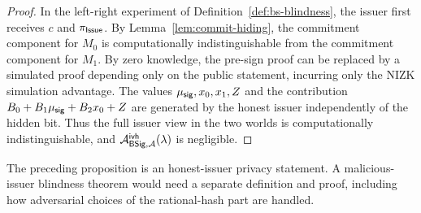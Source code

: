 \begin{proof}
In the left-right experiment of Definition~\ref{def:bs-blindness}, the issuer first receives \(c\) and
\(\pi_{\mathsf{Issue}}\).  By Lemma~\ref{lem:commit-hiding}, the commitment component for \(M_0\) is computationally
indistinguishable from the commitment component for \(M_1\).  By zero knowledge, the pre-sign proof can be
replaced by a simulated proof depending only on the public statement, incurring only the NIZK simulation advantage.
The values \(\mu_{\mathsf{sig}},x_0,x_1,Z\) and the contribution \(B_0+B_1\mu_{\mathsf{sig}}+B_2x_0+Z\) are generated by the honest issuer
independently of the hidden bit.  Thus the full issuer view in the two worlds is computationally indistinguishable,
and \(\mathcal{A}^{\mathsf{ivh}}_{\mathsf{BSig},\mathcal{A}}(\lambda)\) is negligible.
\end{proof}

\begin{remark}\label{rem:no-malicious-issuer-blindness}
The preceding proposition is an honest-issuer privacy statement.  A malicious-issuer blindness theorem would need a
separate definition and proof, including how adversarial choices of the rational-hash part are handled.
\end{remark}
